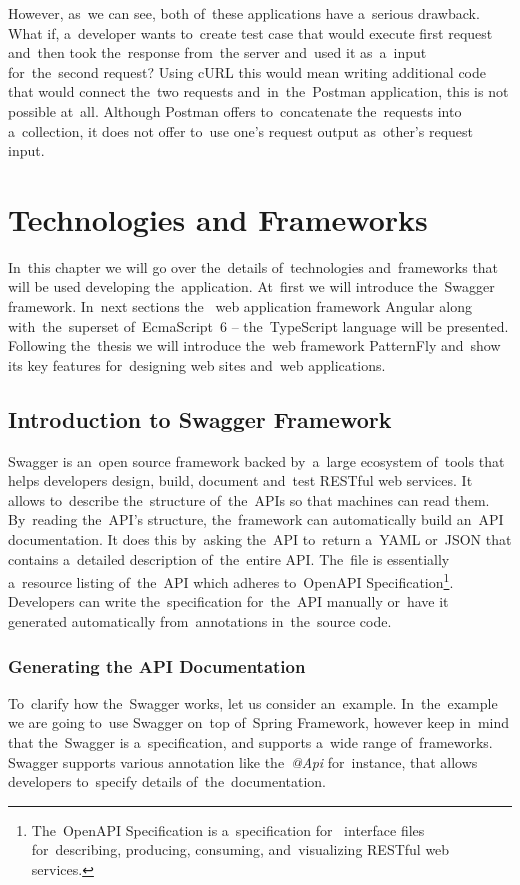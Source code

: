 However, as~we can see, both of~these applications have a~serious drawback. What
if, a~developer wants to~create test case that would execute first request
and~then took the~response from~the server and~used it as~a~input for~the~second
request? Using cURL this would mean writing additional code that would connect
the~two requests and~in~the~Postman application, this is not possible at~all.
Although Postman offers to~concatenate the~requests into a~collection, it does
not offer to~use one's request output as~other's request input.

\chapter{Technologies and Frameworks}
\label{Technologies}
In~this chapter we will go over the~details of~technologies and~frameworks that
will be used developing the~application. At~first we will introduce the~Swagger
framework. In~next sections the~ web application framework Angular
along with~the~superset of~EcmaScript~6 -- the~TypeScript language will be
presented. Following the~thesis we will introduce the~web framework
PatternFly and~show its key features for~designing web sites and~web
applications.

\section{Introduction to Swagger Framework}
Swagger is an~open source framework backed by~a~large ecosystem of~tools that
helps developers design, build, document and~test RESTful web services. It
allows to~describe the~structure of~the~APIs so that machines can read them.
By~reading the~API's structure, the~framework can automatically build an~API
documentation. It does this by~asking the~API to~return a~YAML or~JSON that
contains a~detailed description of~the~entire API. The~file is essentially
a~resource listing of~the~API which adheres to~OpenAPI
Specification\footnote{The~OpenAPI Specification is a~specification
for~ interface files for~describing, producing, consuming,
and~visualizing RESTful web services.}. Developers can write the~specification
for~the~API manually or~have it generated automatically from~annotations
in~the~source code.

\subsection{Generating the API Documentation}
To~clarify how the~Swagger works, let us consider an~example. In~the~example we
are going to~use Swagger on~top of~Spring Framework, however keep in~mind that
the~Swagger is a~specification, and supports a~wide range of~frameworks. Swagger
supports various annotation like the~\textit{@Api} for~instance, that allows
developers to~specify details of~the~documentation.

